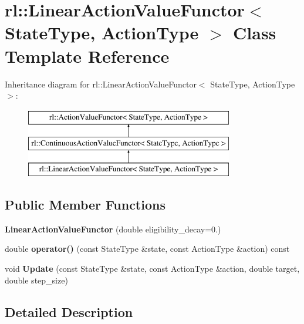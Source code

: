 \hypertarget{classrl_1_1_linear_action_value_functor}{}\section{rl\+:\+:Linear\+Action\+Value\+Functor$<$ State\+Type, Action\+Type $>$ Class Template Reference}
\label{classrl_1_1_linear_action_value_functor}
Inheritance diagram for rl\+:\+:Linear\+Action\+Value\+Functor$<$ State\+Type, Action\+Type $>$\+:\begin{figure}[H]
\begin{center}
\leavevmode
\includegraphics[height=3.000000cm]{classrl_1_1_linear_action_value_functor}
\end{center}
\end{figure}
\subsection*{Public Member Functions}
\begin{DoxyCompactItemize}
\item 
\hypertarget{classrl_1_1_linear_action_value_functor_a84a8c9880033cf465ef8047c3d2172b8}{}\label{classrl_1_1_linear_action_value_functor_a84a8c9880033cf465ef8047c3d2172b8} 
{\bfseries Linear\+Action\+Value\+Functor} (double eligibility\+\_\+decay=0.)
\item 
\hypertarget{classrl_1_1_linear_action_value_functor_a36ed5858d2ded07fd4abe679d23117f9}{}\label{classrl_1_1_linear_action_value_functor_a36ed5858d2ded07fd4abe679d23117f9} 
double {\bfseries operator()} (const State\+Type \&state, const Action\+Type \&action) const
\item 
\hypertarget{classrl_1_1_linear_action_value_functor_ab538729b517740430c17b26f34b08867}{}\label{classrl_1_1_linear_action_value_functor_ab538729b517740430c17b26f34b08867} 
void {\bfseries Update} (const State\+Type \&state, const Action\+Type \&action, double target, double step\+\_\+size)
\end{DoxyCompactItemize}


\subsection{Detailed Description}
